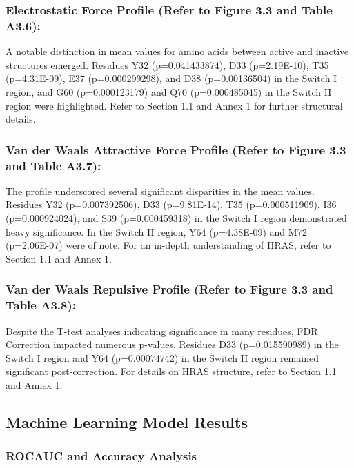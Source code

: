 \documentclass{article}
\begin{document}
\subsubsection{\textbf{Electrostatic Force Profile} (Refer to Figure 3.3 and Table A3.6):}

A notable distinction in mean values for amino acids between active and inactive structures emerged. Residues Y32 (p=0.041433874), D33 (p=2.19E-10), T35 (p=4.31E-09), E37 (p=0.000299298), and D38 (p=0.00136504) in the Switch I region, and G60 (p=0.000123179) and Q70 (p=0.000485045) in the Switch II region were highlighted. Refer to Section 1.1 and Annex 1 for further structural details.

\subsubsection{\textbf{Van der Waals Attractive Force Profile} (Refer to Figure 3.3 and Table A3.7):}

The profile underscored several significant disparities in the mean values. Residues Y32 (p=0.007392506), D33 (p=9.81E-14), T35 (p=0.000511909), I36 (p=0.000924024), and S39 (p=0.000459318) in the Switch I region demonstrated heavy significance. In the Switch II region, Y64 (p=4.38E-09) and M72 (p=2.06E-07) were of note. For an in-depth understanding of HRAS, refer to Section 1.1 and Annex 1.

\subsubsection{\textbf{Van der Waals Repulsive Profile} (Refer to Figure 3.3 and Table A3.8):}

Despite the T-test analyses indicating significance in many residues, FDR Correction impacted numerous p-values. Residues D33 (p=0.015590989) in the Switch I region and Y64 (p=0.00074742) in the Switch II region remained significant post-correction. For details on HRAS structure, refer to Section 1.1 and Annex 1.

\subsection{Machine Learning Model Results}

\subsubsection{ROCAUC and Accuracy Analysis}
\end{document}
